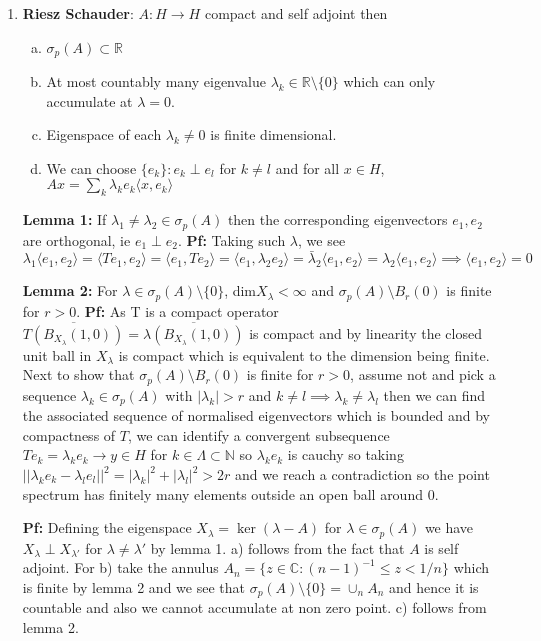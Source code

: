 \documentclass{article}
\begin{document}
\begin{enumerate}
    
    \item \textbf{Riesz Schauder}: \(A:H \to H\) compact and self adjoint then
    \begin{enumerate} [a.]
        \item \(\sigma_p(A) \subset \mathbb{R}\)
        \item At most countably many eigenvalue \(\lambda_k \in \mathbb{R}\setminus\{0\}\) which can only accumulate at \(\lambda = 0\). 
        \item Eigenspace of each \(\lambda_k \neq 0\) is finite dimensional.
        \item We can choose \(\{e_k\}: e_k \perp e_l\) for \(k \neq l\) and for all \(x \in H\), \(Ax = \sum_k \lambda_k e_k \langle x, e_k\rangle\)
    \end{enumerate}

    \textbf{Lemma 1:} If \(\lambda_1 \neq \lambda_2 \in \sigma_p(A)\) then the corresponding eigenvectors \(e_1, e_2\) are orthogonal, ie \(e_1 \perp e_2\). \textbf{Pf:} Taking such \(\lambda\), we see \(\lambda_1\langle e_1, e_2\rangle = \langle Te_1, e_2 \rangle = \langle e_1, T e_2\rangle = \langle e_1, \lambda_2 e_2\rangle = \bar \lambda_2 \langle e_1, e_2\rangle = \lambda_2 \langle e_1, e_2\rangle \implies \langle e_1, e_2\rangle = 0\)

    \textbf{Lemma 2:} For \(\lambda \in \sigma_p(A) \setminus \{0\}\), dim\(X_\lambda< \infty\) and \(\sigma_p(A) \setminus B_r(0)\) is finite for \(r>0\). \textbf{Pf:} As T is a compact operator \(\overline{T(B_{X_\lambda}(1, 0))} = \overline{\lambda(B_{X_\lambda}(1, 0))}\) is compact and by linearity the closed unit ball in \(X_\lambda\) is compact which is equivalent to the dimension being finite. Next to show that \(\sigma_p(A) \setminus B_r(0)\) is finite for \(r>0\), assume not and pick a sequence \(\lambda_k \in \sigma_p(A)\) with \(|\lambda_k| > r\) and \(k \neq l \implies \lambda_k \neq \lambda_l\) then we can find the associated sequence of normalised eigenvectors which is bounded and by compactness of \(T\), we can identify a convergent subsequence \(Te_k = \lambda_ke_k \to y \in H\) for \(k \in \Lambda \subset \mathbb{N}\) so \(\lambda_ke_k\) is cauchy so taking \(||\lambda_k e_k - \lambda_l e_l||^2 = |\lambda_k|^2 + |\lambda_l|^2 >2r\) and we reach a contradiction so the point spectrum has finitely many elements outside an open ball around 0.

    \textbf{Pf:} Defining the eigenspace \(X_\lambda = \ker (\lambda - A)\) for \(\lambda \in \sigma_p(A)\) we have \(X_\lambda \perp X_{\lambda'}\) for \(\lambda \neq \lambda'\) by lemma 1. a) follows from the fact that \(A\) is self adjoint. For b) take the annulus \(A_n = \{z \in \mathbb{C}: (n-1)^{-1} \leq z < 1/n\}\) which is finite by lemma 2 and we see that \(\sigma_p(A) \setminus \{0\}= \cup_n A_n\) and hence it is countable and also we cannot accumulate at non zero point. c) follows from lemma 2.


\end{enumerate}
\end{document}
